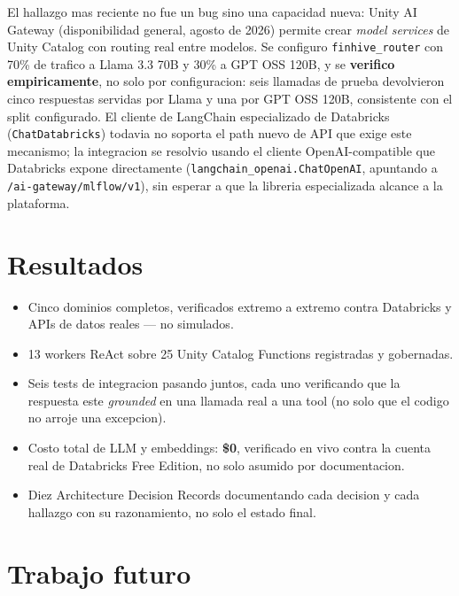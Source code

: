 \documentclass[11pt]{article}
\begin{document}
El hallazgo mas reciente no fue un bug sino una capacidad nueva: Unity AI
Gateway (disponibilidad general, agosto de 2026) permite crear
\emph{model services} de Unity Catalog con routing real entre modelos. Se
configuro \texttt{finhive\_router} con 70\% de trafico a Llama 3.3 70B y
30\% a GPT OSS 120B, y se \textbf{verifico empiricamente}, no solo por
configuracion: seis llamadas de prueba devolvieron cinco respuestas servidas
por Llama y una por GPT OSS 120B, consistente con el split configurado.
El cliente de LangChain especializado de Databricks (\texttt{ChatDatabricks})
todavia no soporta el path nuevo de API que exige este mecanismo; la
integracion se resolvio usando el cliente OpenAI-compatible que Databricks
expone directamente (\texttt{langchain\_openai.ChatOpenAI}, apuntando a
\texttt{/ai-gateway/mlflow/v1}), sin esperar a que la libreria especializada
alcance a la plataforma.

\section{Resultados}

\begin{itemize}[leftmargin=*]
  \item Cinco dominios completos, verificados extremo a extremo contra
  Databricks y APIs de datos reales --- no simulados.
  \item 13 workers ReAct sobre 25 Unity Catalog Functions registradas y
  gobernadas.
  \item Seis tests de integracion pasando juntos, cada uno verificando que
  la respuesta este \emph{grounded} en una llamada real a una tool (no solo
  que el codigo no arroje una excepcion).
  \item Costo total de LLM y embeddings: \textbf{\$0}, verificado en vivo
  contra la cuenta real de Databricks Free Edition, no solo asumido por
  documentacion.
  \item Diez Architecture Decision Records documentando cada decision y cada
  hallazgo con su razonamiento, no solo el estado final.
\end{itemize}

\section{Trabajo futuro}
\label{sec:futuro}
\end{document}
